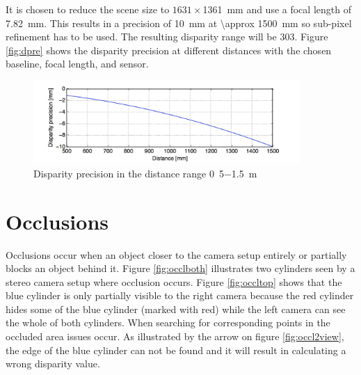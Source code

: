 It is chosen to reduce the scene size to $1631 \times$\SI{1361}{\milli\meter} and use a focal length of \SI{7.82}{\milli\meter}. This results in a precision of  \SI{10}{\milli\meter} at  \SI{\approx 1500}{\milli\meter} so sub-pixel refinement has to be used. The resulting disparity range will be 303. Figure \vref{fig:dpre} shows the disparity precision at different distances with the chosen baseline, focal length, and sensor.
\begin{figure}[ht!]
  \centering
  \includegraphics[width=0.9\textwidth]{figures/dpre}
  \caption{Disparity precision in the distance range \si{0.5}\SI{-1.5}{\meter}}
  \label{fig:dpre}
\end{figure}

\section{Occlusions}
Occlusions occur when an object closer to the camera setup entirely or partially blocks an object behind it. Figure \vref{fig:occlboth} illustrates two cylinders seen by a stereo camera setup where occlusion occurs. Figure \vref{fig:occltop} shows that the blue cylinder is only partially visible to the right camera because the red cylinder hides some of the blue cylinder (marked with red) while the left camera can see the whole of both cylinders. When searching for corresponding points in the occluded area issues occur. As illustrated by the arrow on figure \vref{fig:occl2view}, the edge of the blue cylinder can not be found and it will result in calculating a wrong disparity value. \\

